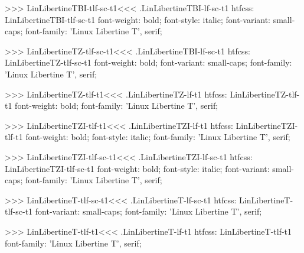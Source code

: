 {{{{{{{>>>
\<LinLibertineTBI-tlf-sc-t1\><<<
.LinLibertineTBI-lf-sc-t1
htfcss:  LinLibertineTBI-tlf-sc-t1  font-weight: bold; font-style: italic; font-variant: small-caps; font-family: 'Linux Libertine T', serif;

>>>
\<LinLibertineTZ-tlf-sc-t1\><<<
.LinLibertineTBI-lf-sc-t1
htfcss:  LinLibertineTZ-tlf-sc-t1  font-weight: bold; font-variant: small-caps; font-family: 'Linux Libertine T', serif;

>>>
\<LinLibertineTZ-tlf-t1\><<<
.LinLibertineTZ-lf-t1
htfcss:  LinLibertineTZ-tlf-t1  font-weight: bold; font-family: 'Linux Libertine T', serif;

>>>
\<LinLibertineTZI-tlf-t1\><<<
.LinLibertineTZI-lf-t1
htfcss:  LinLibertineTZI-tlf-t1  font-weight: bold; font-style: italic; font-family: 'Linux Libertine T', serif;

>>>
\<LinLibertineTZI-tlf-sc-t1\><<<
.LinLibertineTZI-lf-sc-t1
htfcss:  LinLibertineTZI-tlf-sc-t1  font-weight: bold; font-style: italic; font-variant: small-caps; font-family: 'Linux Libertine T', serif;

>>>
\<LinLibertineT-tlf-sc-t1\><<<
.LinLibertineT-lf-sc-t1
htfcss:  LinLibertineT-tlf-sc-t1  font-variant: small-caps; font-family: 'Linux Libertine T', serif;

>>>
\<LinLibertineT-tlf-t1\><<<
.LinLibertineT-lf-t1
htfcss:  LinLibertineT-tlf-t1  font-family: 'Linux Libertine T', serif;

}}}}}}}
